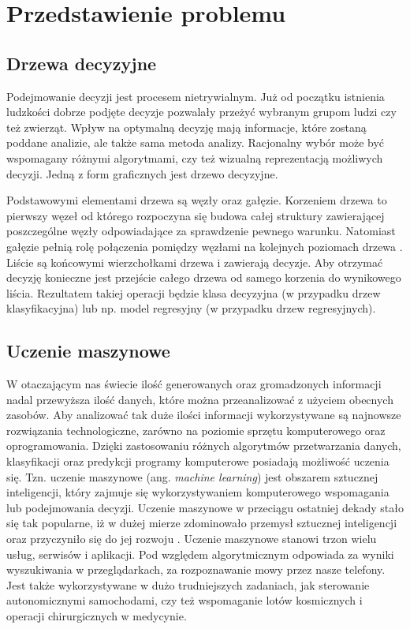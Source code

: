 \chapter{Przedstawienie problemu}

\section{Drzewa decyzyjne}


Podejmowanie decyzji jest procesem nietrywialnym. Już od początku istnienia ludzkości dobrze podjęte decyzje pozwalały przeżyć wybranym grupom ludzi czy też zwierząt. Wpływ na optymalną decyzję mają informacje, które zostaną poddane analizie, ale także sama metoda analizy. Racjonalny wybór może być wspomagany różnymi algorytmami, czy też wizualną reprezentacją możliwych decyzji. Jedną z form graficznych jest drzewo decyzyjne.

Podstawowymi elementami drzewa są węzły oraz gałęzie. Korzeniem drzewa to pierwszy węzeł od którego rozpoczyna się budowa całej struktury zawierającej poszczególne węzły odpowiadające za sprawdzenie pewnego warunku. Natomiast gałęzie pełnią rolę połączenia pomiędzy węzłami na kolejnych poziomach drzewa \cite{misc_1}.  Liście są końcowymi wierzchołkami drzewa i zawierają decyzje. Aby otrzymać decyzję konieczne jest przejście całego drzewa od samego korzenia do wynikowego liścia. Rezultatem takiej operacji będzie klasa decyzyjna (w przypadku drzew klasyfikacyjna) lub np. model regresyjny (w przypadku drzew regresyjnych).

\section{Uczenie maszynowe}
W otaczającym nas świecie ilość generowanych oraz gromadzonych informacji nadal przewyższa ilość danych, które można przeanalizować z użyciem obecnych zasobów. Aby analizować tak duże ilości informacji wykorzystywane są najnowsze rozwiązania technologiczne, zarówno na poziomie sprzętu komputerowego oraz oprogramowania. Dzięki zastosowaniu różnych algorytmów przetwarzania danych, klasyfikacji oraz predykcji programy komputerowe posiadają możliwość uczenia się. Tzn. uczenie maszynowe (ang. \textit{machine learning}) jest obszarem sztucznej inteligencji, który zajmuje się wykorzystywaniem komputerowego wspomagania lub podejmowania decyzji. Uczenie maszynowe w przeciągu ostatniej dekady stało się tak popularne, iż w dużej mierze zdominowało przemysł sztucznej inteligencji oraz przyczyniło się do jej rozwoju \cite{book_1}. Uczenie maszynowe stanowi trzon wielu usług, serwisów i aplikacji. Pod względem algorytmicznym odpowiada za wyniki wyszukiwania w przeglądarkach, za rozpoznawanie mowy przez nasze telefony. Jest także wykorzystywane w dużo trudniejszych zadaniach, jak sterowanie autonomicznymi samochodami, czy też wspomaganie lotów kosmicznych i operacji chirurgicznych w medycynie.

